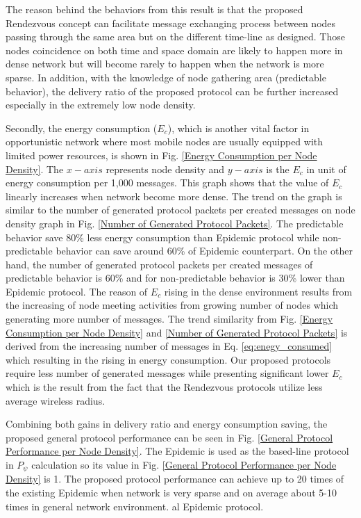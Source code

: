 The reason behind the behaviors from this result is that the proposed Rendezvous concept can facilitate message exchanging process between nodes passing through the same area but on the different time-line as designed.
Those nodes coincidence on both time and space domain are likely to happen more in dense network but will become rarely to happen when the network is more sparse.
In addition, with the knowledge of node gathering area (predictable behavior), the delivery ratio of the proposed protocol can be further increased especially in the extremely low node density. 

Secondly, the energy consumption ($E_c$), which is another vital factor in opportunistic network where most mobile nodes are usually equipped with limited power resources, is shown in Fig. \ref{Energy Consumption per Node Density}.
The $x-axis$ represents node density and $y-axis$ is the $E_c$ in unit of energy consumption per 1,000 messages.
This graph shows that the value of $E_c$ linearly increases when network become more dense.
The trend on the graph is similar to the number of generated protocol packets per created messages on node density graph in Fig. \ref{Number of Generated Protocol Packets}.
The predictable behavior save 80\% less energy consumption than Epidemic protocol while non-predictable behavior can save around 60\% of Epidemic counterpart.
On the other hand, the number of generated protocol packets per created messages of predictable behavior is 60\% and for non-predictable behavior is 30\% lower than Epidemic protocol.
The reason of $E_c$ rising in the dense environment results from the increasing of node meeting activities from growing number of nodes which generating more number of messages.
%
The trend similarity from Fig. \ref{Energy Consumption per Node Density} and \ref{Number of Generated Protocol Packets} is derived from the increasing number of messages in Eq. \ref{eq:enegy_consumed} which resulting in the rising in energy consumption. 
Our proposed protocols require less number of generated messages while presenting significant lower $E_c$ which is the result from the fact that the Rendezvous protocols utilize less average wireless radius.

Combining both gains in delivery ratio and energy consumption saving, the proposed general protocol performance can be seen in Fig. \ref{General Protocol Performance per Node Density}. 
%
The Epidemic is used as the based-line protocol in $P_{\psi}$ calculation so its value in Fig. \ref{General Protocol Performance per Node Density} is 1.
%
The proposed protocol performance can achieve up to 20 times of the existing Epidemic when network is very sparse and on average about 5-10 times in general network environment.
al Epidemic protocol.

